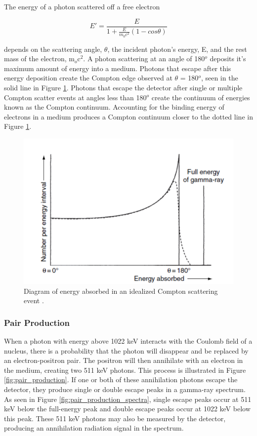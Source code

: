 The energy of a photon scattered off a free electron

\begin{equation} \label{eq:compton_scatter}
E' = \frac{E}{1 + \frac{E}{m_{0} c^2} (1-cos\theta)}
\end{equation}

depends on the scattering angle, $\theta$, the incident photon's energy, E, and the rest mass of the electron, m$_{o}$c$^{2}$. A photon scattering at an angle of 180$^{o}$ deposits it's maximum amount of energy into a medium. Photons that escape after this energy deposition create the Compton edge observed at $\theta$ = 180$^{o}$, seen in the solid line in Figure \ref{fig:ideal_compton}. Photons that escape the detector after single or multiple Compton scatter events at angles less than 180$^{o}$ create the continuum of energies known as the Compton continuum. Accounting for the binding energy of electrons in a medium produces a Compton continuum closer to the dotted line in Figure \ref{fig:ideal_compton}.

\begin{figure}[H]
\centering
\includegraphics[width=0.75\linewidth]{images/ideal_compton}
\caption{Diagram of energy absorbed in an idealized Compton scattering event \cite{gilmore}.}
\label{fig:ideal_compton}
\end{figure}



\subsubsection{Pair Production}

When a photon with energy above 1022 keV interacts with the Coulomb field of a nucleus, there is a probability that the photon will disappear and be replaced by an electron-positron pair. The positron will then annihilate with an electron in the medium, creating two 511 keV photons. This process is illustrated in Figure \ref{fig:pair_production}. If one or both of these annihilation photons escape the detector, they produce single or double escape peaks in a gamma-ray spectrum. As seen in Figure \ref{fig:pair_production_spectra}, single escape peaks occur at 511 keV below the full-energy peak and double escape peaks occur at 1022 keV below this peak. These 511 keV photons may also be measured by the detector, producing an annihilation radiation signal in the spectrum.

